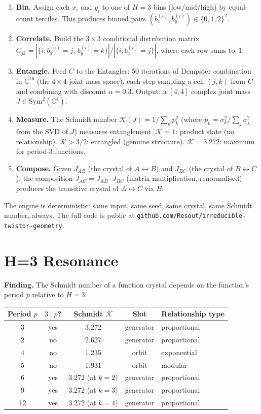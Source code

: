 \documentclass[11pt,a4paper]{article}
\theoremstyle{definition}
\theoremstyle{remark}
\newcommand{\C}{\mathbb{C}}
\begin{document}
\begin{enumerate}[nosep]
\item \textbf{Bin.} Assign each $x_i$ and $y_i$ to one of $H=3$ bins (low/mid/high) by equal-count terciles. This produces binned pairs $(b_x^{(i)}, b_y^{(i)}) \in \{0,1,2\}^2$.
\item \textbf{Correlate.} Build the $3\times 3$ conditional distribution matrix $C_{jk} = |\{i : b_x^{(i)}=j,\, b_y^{(i)}=k\}| / |\{i : b_x^{(i)}=j\}|$, where each row sums to~$1$.
\item \textbf{Entangle.} Feed $C$ to the Entangler: 50 iterations of Dempster combination in $\C^{16}$ (the $4\times 4$ joint mass space), each step sampling a cell $(j,k)$ from $C$ and combining with discount $\alpha=0.3$. Output: a $[4,4]$ complex joint mass $J \in \mathrm{Sym}^2(\C^4)$.
\item \textbf{Measure.} The Schmidt number $\mathcal{K}(J) = 1/\sum_k p_k^2$ (where $p_k = \sigma_k^2/\sum_j \sigma_j^2$ from the SVD of $J$) measures entanglement. $\mathcal{K}=1$: product state (no relationship). $\mathcal{K}>3/2$: entangled (genuine structure). $\mathcal{K}=3.272$: maximum for period-$3$ functions.
\item \textbf{Compose.} Given $J_{AB}$ (the crystal of $A\leftrightarrow B$) and $J_{BC}$ (the crystal of $B\leftrightarrow C$), the composition $J_{AC} = J_{AB} \cdot J_{BC}$ (matrix multiplication, renormalised) produces the transitive crystal of $A\leftrightarrow C$ via $B$.
\end{enumerate}

The engine is deterministic: same input, same seed, same crystal, same Schmidt number, always. The full code is public at \texttt{github.com/Resout/irreducible-twistor-geometry}.


\section{H=3 Resonance}\label{sec:resonance}

\textbf{Finding.} The Schmidt number of a function crystal depends on the function's period $p$ relative to $H=3$:

\begin{center}
\begin{tabular}{ccccl}
\toprule
Period $p$ & $3 \mid p$? & Schmidt $\mathcal{K}$ & Slot & Relationship type \\
\midrule
3 & yes & 3.272 & generator & proportional \\
2 & no  & 2.627 & generator & proportional \\
4 & no  & 1.235 & orbit & exponential \\
5 & no  & 1.931 & orbit & modular \\
6 & yes & 3.272 (at $k=2$) & generator & proportional \\
9 & yes & 3.272 (at $k=3$) & generator & proportional \\
12 & yes & 3.272 (at $k=4$) & generator & proportional \\
\bottomrule
\end{tabular}
\end{center}
\end{document}
